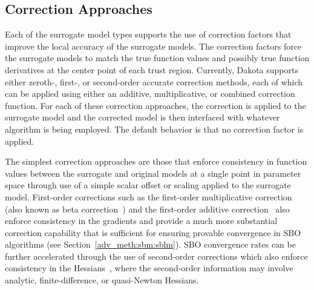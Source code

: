 \subsection{Correction Approaches}

Each of the surrogate model types supports the use of correction
factors that improve the local accuracy of the surrogate models. The
correction factors force the surrogate models to match the true
function values and possibly true function derivatives at the center
point of each trust region. Currently, Dakota supports either zeroth-,
first-, or second-order accurate correction methods, each of which can
be applied using either an additive, multiplicative, or combined
correction function. For each of these correction approaches, the
correction is applied to the surrogate model and the corrected model
is then interfaced with whatever algorithm is being employed.  The
default behavior is that no correction factor is applied.

The simplest correction approaches are those that enforce consistency
in function values between the surrogate and original models at a
single point in parameter space through use of a simple scalar offset
or scaling applied to the surrogate model.  First-order corrections
such as the first-order multiplicative correction (also known as beta
correction~\cite{Cha93}) and the first-order additive
correction~\cite{Lew00} also enforce consistency in the gradients and
provide a much more substantial correction capability that is
sufficient for ensuring provable convergence in SBO algorithms (see
Section~\ref{adv_meth:sbm:sblm}).  SBO convergence rates can be further
accelerated through the use of second-order corrections which also
enforce consistency in the Hessians~\cite{Eld04}, where the
second-order information may involve analytic, finite-difference, or
quasi-Newton Hessians.

